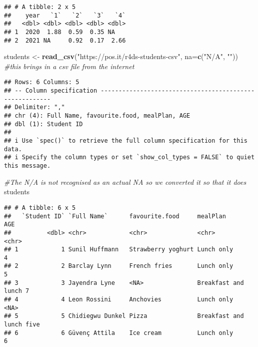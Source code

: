\documentclass[
]{article}
\newenvironment{Shaded}{\begin{snugshade}}{\end{snugshade}}
\newcommand{\AttributeTok}[1]{\textcolor[rgb]{0.13,0.29,0.53}{#1}}
\newcommand{\CommentTok}[1]{\textcolor[rgb]{0.56,0.35,0.01}{\textit{#1}}}
\newcommand{\FunctionTok}[1]{\textcolor[rgb]{0.13,0.29,0.53}{\textbf{#1}}}
\newcommand{\NormalTok}[1]{#1}
\newcommand{\OtherTok}[1]{\textcolor[rgb]{0.56,0.35,0.01}{#1}}
\newcommand{\StringTok}[1]{\textcolor[rgb]{0.31,0.60,0.02}{#1}}
\begin{document}
\begin{verbatim}
## # A tibble: 2 x 5
##    year   `1`   `2`   `3`   `4`
##   <dbl> <dbl> <dbl> <dbl> <dbl>
## 1  2020  1.88  0.59  0.35 NA   
## 2  2021 NA     0.92  0.17  2.66
\end{verbatim}

\begin{Shaded}
\begin{Highlighting}[]
\NormalTok{students }\OtherTok{\textless{}{-}} \FunctionTok{read\_csv}\NormalTok{(}\StringTok{"https://pos.it/r4ds{-}students{-}csv"}\NormalTok{, }\AttributeTok{na=}\FunctionTok{c}\NormalTok{(}\StringTok{"N/A"}\NormalTok{, }\StringTok{""}\NormalTok{)) }\CommentTok{\#this brings in a csv file from the internet}
\end{Highlighting}
\end{Shaded}

\begin{verbatim}
## Rows: 6 Columns: 5
## -- Column specification --------------------------------------------------------
## Delimiter: ","
## chr (4): Full Name, favourite.food, mealPlan, AGE
## dbl (1): Student ID
## 
## i Use `spec()` to retrieve the full column specification for this data.
## i Specify the column types or set `show_col_types = FALSE` to quiet this message.
\end{verbatim}

\begin{Shaded}
\begin{Highlighting}[]
\CommentTok{\#The N/A is not recognised as an actual NA so we converted it so that it does}
\NormalTok{students}
\end{Highlighting}
\end{Shaded}

\begin{verbatim}
## # A tibble: 6 x 5
##   `Student ID` `Full Name`      favourite.food     mealPlan            AGE  
##          <dbl> <chr>            <chr>              <chr>               <chr>
## 1            1 Sunil Huffmann   Strawberry yoghurt Lunch only          4    
## 2            2 Barclay Lynn     French fries       Lunch only          5    
## 3            3 Jayendra Lyne    <NA>               Breakfast and lunch 7    
## 4            4 Leon Rossini     Anchovies          Lunch only          <NA> 
## 5            5 Chidiegwu Dunkel Pizza              Breakfast and lunch five 
## 6            6 Güvenç Attila    Ice cream          Lunch only          6
\end{verbatim}
\end{document}
